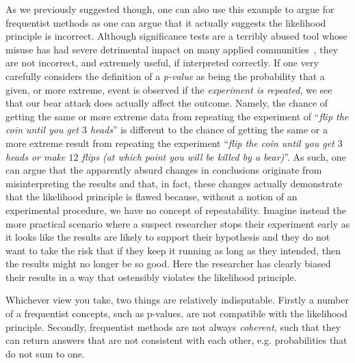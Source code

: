 As we previously suggested though, one can also use this example to argue for frequentist methods as one can argue that it actually
suggests the likelihood principle is incorrect.  Although significance tests are a terribly abused tool whose misuse has had
severe detrimental impact on many applied communities~\citep{goodman1999toward,ioannidis2005most}, they are not incorrect,
and extremely useful, if 
interpreted correctly.  If one very carefully considers
the definition of a \emph{p-value} as being the probability that a given, or more extreme, event is observed if the
\emph{experiment is repeated}, we see that our bear attack does actually affect the outcome.  Namely, the chance of getting the same
or more extreme data from repeating the experiment of ``\textit{flip the coin until you get $3$ heads}'' is different to 
the chance of getting the same or a more extreme result from repeating the experiment 
``\textit{flip the coin until you get $3$ heads or make $12$ flips (at which point you will be killed by a bear)}''.  
As such, one can argue that the apparently absurd
changes in conclusions originate from misinterpreting the results and that, in fact, these changes actually demonstrate
that the likelihood principle is flawed because, without a notion of an experimental procedure, 
we have no concept of repeatability.  Imagine instead the more practical scenario where a suspect researcher stops their experiment
early as it looks like the results are likely to support their hypothesis and they do not want to take the risk that if they
keep it running as long as they intended, then the results might no longer be so good.  Here the researcher has clearly
biased their results in a way that ostensibly violates the likelihood principle.

Whichever view you take, two things are relatively indisputable.  Firstly a number of a frequentist concepts, such as p-values,
are not compatible with the likelihood principle.  Secondly, frequentist methods are not always \emph{coherent}, such that they can
return answers that are not consistent with each other, e.g. probabilities that do not sum to one.  

